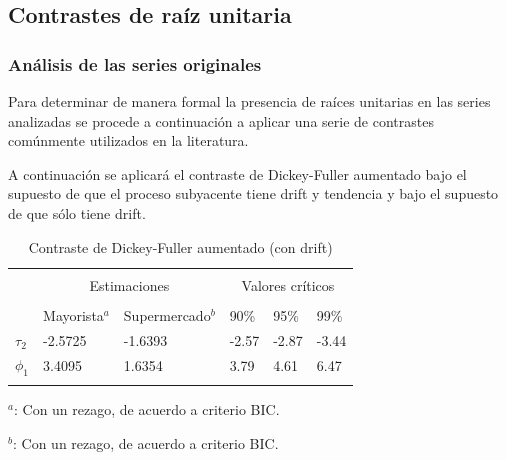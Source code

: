 \documentclass[12pt, twoside]{book}\usepackage[]{graphicx}\usepackage[]{color}
\numberwithin{equation}{section}
\numberwithin{theorem}{section}
\numberwithin{teorema}{section}
\numberwithin{defi}{section}
\numberwithin{prop}{section}
\numberwithin{defi}{section}
\theoremstyle{plain}
\begin{document}
\subsection{Contrastes de raíz unitaria}

\subsubsection{Análisis de las series originales}
Para determinar de manera formal la presencia de raíces unitarias en las series analizadas se procede a continuación a aplicar una serie de contrastes comúnmente utilizados en la literatura. 




A continuación se aplicará el contraste de Dickey-Fuller aumentado bajo el supuesto de que el proceso subyacente tiene drift y tendencia y bajo el supuesto de que sólo tiene drift. 

\begin{center}
\begin{table}[h]
\caption{Contraste de Dickey-Fuller aumentado (con drift)\label{tab:dickey1}}
\centering
\begin{threeparttable}
\begin{tabular}{@{}llllll@{}}
\toprule \\
\multicolumn{1}{l}{} & \multicolumn{2}{c}{Estimaciones} &
\multicolumn{3}{c}{Valores críticos} \\
\cmidrule(l){2-3} \cmidrule(l){4-6} \\
\multicolumn{1}{l}{} & \multicolumn{1}{c}{Mayorista$^{a}$} &
 \multicolumn{1}{c}{Supermercado$^{b}$} &
\multicolumn{1}{l}{90\%}&
\multicolumn{1}{l}{95\%}&
\multicolumn{1}{l}{99\%}
\\
\midrule
$\tau_{2} $  & -2.5725 &  -1.6393  & -2.57 & -2.87 & -3.44 \\
$\phi_{1} $  & 3.4095  &  1.6354   & 3.79 & 4.61 &  6.47\\
\bottomrule \\
\end{tabular}
\begin{tablenotes}
\small 
\item $^{a}$: Con un rezago, de acuerdo a criterio BIC. 
\item $^{b}$: Con un rezago, de acuerdo a criterio BIC. 
\end{tablenotes}
\end{threeparttable}
\end{table}
\end{center}
\end{document}
